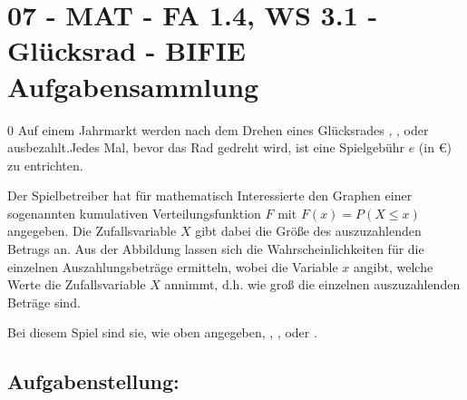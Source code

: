 \section{07 - MAT - FA 1.4, WS 3.1 - Glücksrad - BIFIE Aufgabensammlung}

\begin{langesbeispiel} \item[0] %
				Auf einem Jahrmarkt werden nach dem Drehen eines Glücksrades , ,  oder  ausbezahlt.Jedes Mal, bevor das Rad gedreht wird, ist eine Spielgebühr $e$ (in \euro) zu entrichten.
				
Der Spielbetreiber hat für mathematisch Interessierte den Graphen einer sogenannten kumulativen Verteilungsfunktion $F$ mit $F(x)=P(X \leq x)$ angegeben. Die Zufallsvariable $X$ gibt dabei die Größe des auszuzahlenden Betrags an. Aus der Abbildung lassen sich die Wahrscheinlichkeiten für die einzelnen Auszahlungsbeträge ermitteln, wobei die Variable $x$ angibt, welche Werte die Zufallsvariable $X$ annimmt, d.h. wie groß die einzelnen auszuzahlenden Beträge sind.

Bei diesem Spiel sind sie, wie oben angegeben, , ,  oder . 
				\leer
				\begin{center}
				\end{center}
				
\subsection{Aufgabenstellung:}


\end{langesbeispiel}
